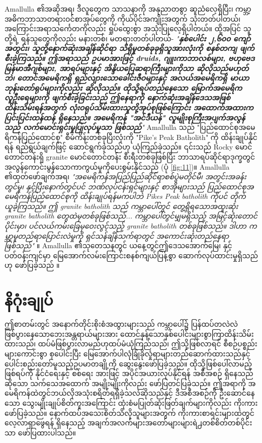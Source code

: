 \documentclass[10pt,twocolumn,letterpaper]{article}
\begin{document}
\begin{flushleft}
\begin{enumerate}
{Amallulla ၏အဆိုအရ၊ ဒီလူတွေက သာသနာကို အနုညာတစွာ ဆူညံလေ့ရှိပြီး၊ ကမ္ဘာ့အဓိကဘာသာတရားဝင်စာအုပ်တွေကို ကိုယ်ပိုင်အကျိုးအတွက် သုံးတတ်ပါတယ်၊ အကြောင်းအရာသင်္ကေတကိုလည်း ရှုပ်ထွေးစွာ အသုံးပြုလေ့ရှိပါတယ်။ ထို့အပြင် သူတို့ရဲ့ ရန်သူတွေကိုလည်း မနားတစ်၊ မတရားတတ်ပါတယ်- \textit{"\textbf{နှစ်ပေါင်း ၂,၆၀၀ ကျော်အတွင်း၊ သူတို့နောက်ဆုံးအချိန်ဆိုင်ရာ သိရှိမှုတစ်ခုခုရှိသူအားလုံးကို စနစ်တကျ ဖျက်စီးခဲ့ကြသည်။ ဤအရာသည် ဥပမာအားဖြင့် druids, ဂျူးကာဘာလစ်များ, ဗဟုဗေဒ မြန်မာအီဂျစ်များ, အာရပ်များနှင့် အိန္ဒိယပြေဆရာကြီးများကိုသာ ဆိုလိုသည်မဟုတ်ဘဲ၊ တောင်အမေရိကရှိ ရှည်လျားသောခေါင်းဇီဝများနှင့် အလယ်အမေရိကရှိ မာယာဘုန်းတော်ရုပ်များကိုလည်း ဆိုလိုသည်။ ထိုသို့ရပ်တည်နေသော မြောက်အမေရိက လူဦးရေများကို ဖျက်စီးခဲ့ခြင်းသည် ဤနေရာကို နောက်ဆုံးအချိန်ဒေသအဖြစ် ထိန်းသိမ်းရန်အတွက် လုံးဝရုပ်သိမ်းထားသူတို့အုပ်စုဖြစ်ကြောင်း အထောက်အထားက ပြင်းပြင်းထန်ထန် ရှိနေသည်။ အမေရိကန် "အင်ဒီယန်" လူမျိုးစုကြီးအပျက်အလွန်သည် လက်မောင်းရှင်းမှုပြုလုပ်မှုသာ ဖြစ်သည်}"} \cite{33,34}
Amallulla သည် "ပြည်ထောင်စုအမေရိကန်ပြည်ထောင်စု" စီမံကိန်းတစ်ခုပြီးလုံးကို "Pike's Peak Batholith" ကို ထိန်းချုပ်နိုင်ရန် ရည်ရွယ်ချက်ဖြင့် ဆောင်ရွက်ခဲ့သည်ဟု ယုံကြည်ခဲ့သည်။ ၎င်းသည် Rocky မောင်တောင်တန်းရှိ granite မောင်တောင်တန်း စီးရီးတစ်ခုဖြစ်ပြီး ဘာသာရပ်ဆိုင်ရာဒုက္ခတွင် အလွန်ကောင်းမွန်သောကာကွယ်မှုကိုပေးစွမ်းနိုင်သည် (ပုံ \ref{fig:11})။ Amallulla ၏ထုတ်ဖော်ချက်အရ၊ \textit{"အမေရိကန်အပြည်ပြည်ဆိုင်ရာစစ်ပွဲမတိုင်မီ၊ အတွင်းအခန်းတွင်မူ၊ နှင့်ပြီးနောက်တွင်ပင် ဘဏ်လုပ်ငန်းရှင်များနှင့် စာအိုများသည် ပြည်ထောင်စုအမေရိကန်ပြည်ထောင်စုကို ထိန်းချုပ်ရန်မကပါဘဲ Pikes Peak batholith ကိုပင် တိုက်ယူခဲ့ကြသည်။ ဤ granite batholith သည် ကမ္ဘာပေါ်တွင် တွေ့ရှိရသောအထူးဆုံး granite batholith တွေထဲမှတစ်ခုဖြစ်သည်... ကမ္ဘာပေါ်တွင်မျှမရှိသည့် အမြင့်ဆုံးတောင်ပိုင်းမှာ၊ ပင်လယ်ကမ်းခြေမှဝေးလွင့်သည့် granite batholith တစ်ခုဖြစ်သည်။ ဒါဟာ ကမ္ဘာ့မူတည်ရာပြောင်းလဲမှုကို ရှင်သန်ချိန်သက်ရာတွင် အကောင်းဆုံးတည်နေရာ ဖြစ်သည်"} \cite{33,34} ။ Amallulla ၏သုတေသနတွင် ယနေ့တွင်ဤဒေသအောက်မြေ၊ နှင့် ပတ်ဝန်းကျင်မှာ မြေအောက်လမ်းကြောင်းစနစ်ကျယ်ပြန့်စွာ ဆောက်လုပ်ထာင်းမှုရှိသည်ဟု ဖော်ပြခဲ့သည် \cite{36}။

\section{နိဂုံးချုပ်}

ဤစာတမ်းတွင် အနောက်တိုင်းစိုးစံအထွားများသည် ကမ္ဘာပေါ်၌ ပြန်ထပ်တလဲလဲဖြစ်ပွားနေသောဘေးအန္တရာယ်များအား ထောင်နှန့်သောနှစ်ပေါင်းများစွာကြာထိန်းသိမ်းထားသည်၊ ထပ်မံဖြစ်ပွားလာမည်ဟုထပ်မံယုံကြည်သည်၊ ဤသို့ဖြစ်လာရင် စီစဉ်ပစ္စည်းများကောင်းစွာ စုပေါင်းပြီး မြေအောက်ပါလုံခြုံခိုလှုံရာများတည်ဆောက်ထားသည်နှင့် ပေါင်းစည်းတော်မူသည့်ဥပမာတချို့ကို ဆွေးနွေးဖော်ပြခဲ့သည်။ ထိုသို့ဖြစ်ပေါ်လာမည့်ဖြစ်ရပ်ကို နိုင်ငံရေးနှင့် စစ်ရေး အားဖြင့် အပိုင်အယားလုပ်နိုင်ရန် အစီအစဉ် ရှိနေသည်ဆိုသော သက်သေအထောက် အမျိုးမျိုးကိုလည်း ဖော်ပြတင်ပြခဲ့သည်။ ဤအရာကို အမေရိကန်ထဲတွင်ဘယ်လိုအသုံးစရိတ်ရရှိခဲ့သလဲဆိုသည်နှင့် ဒီအစီအစဉ်ကို ဦးဆောင်နေသော သွေးမျိုးချုပ်စိတ်ကူးအကြောင်း ထုံးစံမပြုတ်ဆုံးဖြတ်ချက်များကိုလည်း ကိုးကားဖော်ပြခဲ့သည်။ နောက်ထပ်အသေးစိတ်သိလိုသူများအတွက် ကိုးကားစာရင်းများထဲတွင် လေ့လာရှာဖွေရန် ရှိနေသည့် အချက်အလက်များအတော်များများရဲ႕တစ်စိတ်တစ်ပိုင်းသာ ဖော်ပြထားပါသည်။

}
\end{enumerate}
\end{flushleft}
\end{document}
